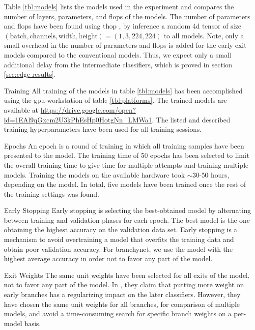 Table \ref{tbl:models} lists the models used in the experiment and compares the number of layers, parameters, and \acrshort{flop}s of the models. The number of parameters and \acrshort{flop}s have been found using \gls{thop} \cite{zhu_thop_nodate}, by inference a random 4d tensor of size $ (\mathrm{batch,channels,width,height})=(1,3,224,224) $ to all models. Note, only a small overhead in the number of parameters and \acrshort{flop}s is added for the early exit models compared to the conventional models. Thus, we expect only a small additional delay from the intermediate classifiers, which is proved in section \ref{sec:edge-results}.


\begin{enumdescript}
	\item[Training] All training of the models in table \ref{tbl:models} has been accomplished using the \gls{gpu}-workstation of table \ref{tbl:platforms}. The trained models are available at {\color{sns-grey}\url{https://drive.google.com/open?id=1EAl9qGxcm2U3kPhEsHp0HotgNn_LMWa1}}.
	The listed and described training hyperparameters have been used for all training sessions. 
	
	\begin{enumdescript}
		\item[Epochs] An epoch is a round of training in which all training samples have been presented to the model. The training time of 50 epochs has been selected to limit the overall training time to give time for multiple attempts and training multiple models. Training the models on the available hardware took $\sim$30-50 hours, depending on the model. In total, five models have been trained once the rest of the training settings was found.
		
		\item[Early Stopping] Early stopping is selecting the best-obtained model by alternating between training and validation phases for each epoch. The best model is the one obtaining the highest accuracy on the validation data set. Early stopping is a mechanism to avoid overtraining a model that overfits the training data and obtain poor validation accuracy. For \gls{branchynet}, we use the model with the highest average accuracy in order not to favor any part of the model.  
		
		\item[Exit Weights] The same unit weights have been selected for all exits of the model, not to favor any part of the model. In \cite{teerapittayanon_branchynet:_2016}, they claim that putting more weight on early branches has a regularizing impact on the later classifiers. However, they have chosen the same unit weights for all branches, for comparison of multiple models, and avoid a time-consuming search for specific branch weights on a per-model basis.
		

\end{enumdescript}
\end{enumdescript}
